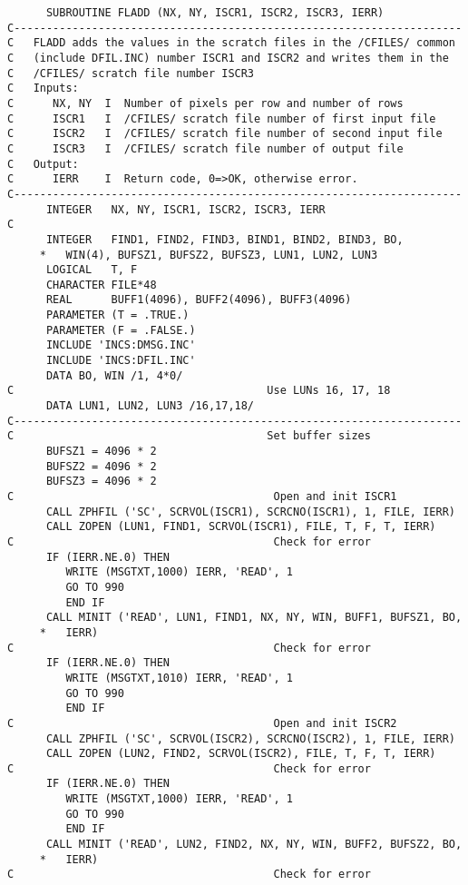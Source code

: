 \begin{verbatim}
      SUBROUTINE FLADD (NX, NY, ISCR1, ISCR2, ISCR3, IERR)
C---------------------------------------------------------------------
C   FLADD adds the values in the scratch files in the /CFILES/ common
C   (include DFIL.INC) number ISCR1 and ISCR2 and writes them in the
C   /CFILES/ scratch file number ISCR3
C   Inputs:
C      NX, NY  I  Number of pixels per row and number of rows
C      ISCR1   I  /CFILES/ scratch file number of first input file
C      ISCR2   I  /CFILES/ scratch file number of second input file
C      ISCR3   I  /CFILES/ scratch file number of output file
C   Output:
C      IERR    I  Return code, 0=>OK, otherwise error.
C---------------------------------------------------------------------
      INTEGER   NX, NY, ISCR1, ISCR2, ISCR3, IERR
C
      INTEGER   FIND1, FIND2, FIND3, BIND1, BIND2, BIND3, BO,
     *   WIN(4), BUFSZ1, BUFSZ2, BUFSZ3, LUN1, LUN2, LUN3
      LOGICAL   T, F
      CHARACTER FILE*48
      REAL      BUFF1(4096), BUFF2(4096), BUFF3(4096)
      PARAMETER (T = .TRUE.)
      PARAMETER (F = .FALSE.)
      INCLUDE 'INCS:DMSG.INC'
      INCLUDE 'INCS:DFIL.INC'
      DATA BO, WIN /1, 4*0/
C                                       Use LUNs 16, 17, 18
      DATA LUN1, LUN2, LUN3 /16,17,18/
C---------------------------------------------------------------------
C                                       Set buffer sizes
      BUFSZ1 = 4096 * 2
      BUFSZ2 = 4096 * 2
      BUFSZ3 = 4096 * 2
C                                        Open and init ISCR1
      CALL ZPHFIL ('SC', SCRVOL(ISCR1), SCRCNO(ISCR1), 1, FILE, IERR)
      CALL ZOPEN (LUN1, FIND1, SCRVOL(ISCR1), FILE, T, F, T, IERR)
C                                        Check for error
      IF (IERR.NE.0) THEN
         WRITE (MSGTXT,1000) IERR, 'READ', 1
         GO TO 990
         END IF
      CALL MINIT ('READ', LUN1, FIND1, NX, NY, WIN, BUFF1, BUFSZ1, BO,
     *   IERR)
C                                        Check for error
      IF (IERR.NE.0) THEN
         WRITE (MSGTXT,1010) IERR, 'READ', 1
         GO TO 990
         END IF
C                                        Open and init ISCR2
      CALL ZPHFIL ('SC', SCRVOL(ISCR2), SCRCNO(ISCR2), 1, FILE, IERR)
      CALL ZOPEN (LUN2, FIND2, SCRVOL(ISCR2), FILE, T, F, T, IERR)
C                                        Check for error
      IF (IERR.NE.0) THEN
         WRITE (MSGTXT,1000) IERR, 'READ', 1
         GO TO 990
         END IF
      CALL MINIT ('READ', LUN2, FIND2, NX, NY, WIN, BUFF2, BUFSZ2, BO,
     *   IERR)
C                                        Check for error

\end{verbatim}
